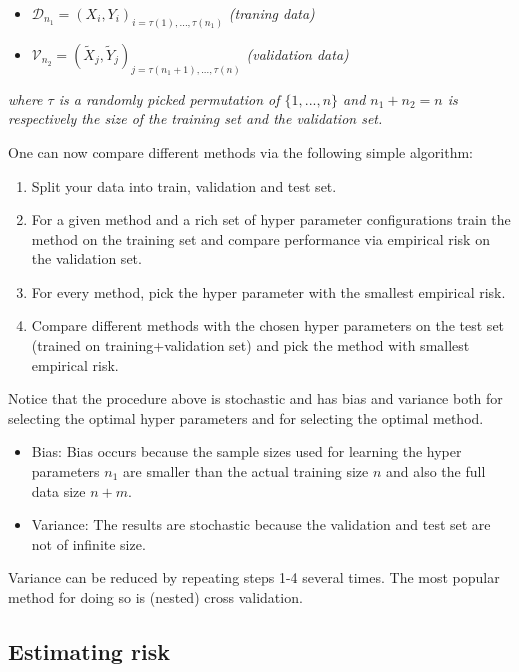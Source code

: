 \documentclass[a4paper,10pt,openany]{book}
\providecommand{\tightlist}{%
 \setlength{\itemsep}{0pt}\setlength{\parskip}{0pt}}
\begin{document}
\begin{itemize}
\tightlist
\item
  \(\mathcal{D}_{n_1}=(X_i,Y_i)_{i=\tau(1),...,\tau(n_1)}\) \emph{(traning data)}
\item
  \(\mathcal{V}_{n_2}=(\tilde{X}_j,\tilde{Y}_j)_{j=\tau(n_1+1),...,\tau(n)}\) \emph{(validation data)}
\end{itemize}

\emph{where \(\tau\) is a randomly picked permutation of \(\{1,...,n\}\) and \(n_1+n_2=n\) is respectively the size of the training set and the validation set.}

One can now compare different methods via the following simple algorithm:

\begin{enumerate}
\def\labelenumi{\arabic{enumi}.}
\tightlist
\item
  Split your data into train, validation and test set.
\item
  For a given method and a rich set of hyper parameter configurations train the method on the training set and compare performance via empirical risk on the validation set.
\item
  For every method, pick the hyper parameter with the smallest empirical risk.
\item
  Compare different methods with the chosen hyper parameters on the test set (trained on training+validation set) and pick the method with smallest empirical risk.
\end{enumerate}

Notice that the procedure above is stochastic and has bias and variance both for selecting the optimal hyper parameters and for selecting the optimal method.

\begin{itemize}
\tightlist
\item
  Bias: Bias occurs because the sample sizes used for learning the hyper parameters \(n_1\) are smaller than the actual training size \(n\) and also the full data size \(n+m\).
\item
  Variance: The results are stochastic because the validation and test set are not of infinite size.
\end{itemize}

Variance can be reduced by repeating steps 1-4 several times. The most popular method for doing so is (nested) cross validation.

\hypertarget{estimating-risk}{%
\subsection{Estimating risk}\label{estimating-risk}}
\end{document}
